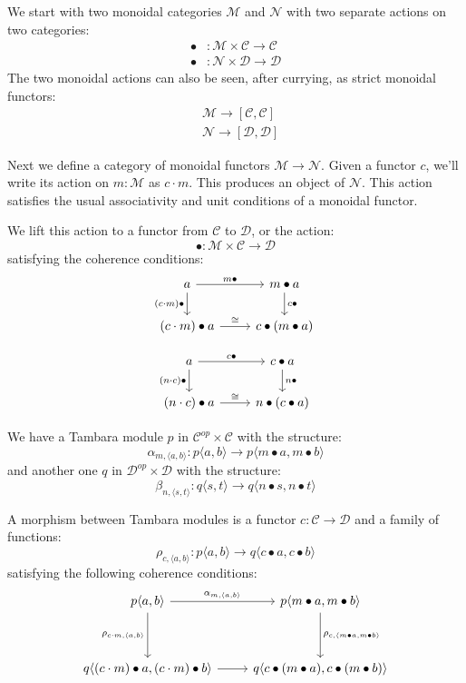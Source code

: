 \documentclass[11pt]{amsart}
\newcommand{\cat}[1]{\mathcal{#1}}%
\begin{document}
We start with two monoidal categories $\cat M$ and $\cat N$ with two separate actions on two categories:
\begin{align*} 
\bullet &\colon \cat M \times \cat C \to \cat C 
\\
 \bullet &\colon \cat N \times \cat D \to \cat D 
\end{align*}
The two monoidal actions can also be seen, after currying, as strict monoidal functors:
\begin{align*}
&\cat M \to [\cat C, \cat C]
\\
&\cat N \to [\cat D, \cat D]
\end{align*}

Next we define a category of monoidal functors $\cat M \to \cat N$. Given a functor $c$, we'll write its action on $m \colon \cat M$ as $c \cdot m$. This produces an object of $\cat N$. This action satisfies the usual associativity and unit conditions of a monoidal functor. 

We lift this action to a functor from $\cat C$ to  $\cat D$, or the action:
\[ \bullet \colon \cat M \times \cat C \to \cat D \]
satisfying the coherence conditions:
\[
 \begin{tikzcd}
 a
 \arrow [r, "m \bullet"] 
 \arrow [d, "(c \cdot m) \bullet"']
 & m \bullet a
 \arrow [d, "c \bullet"]
 \\
 (c \cdot m) \bullet a
 \arrow [r, "\cong"]
 & c \bullet (m \bullet a)
 \end{tikzcd}
\]

\[
 \begin{tikzcd}
 a
 \arrow [r, "c \bullet"] 
 \arrow [d, "(n \cdot c) \bullet"']
 & c \bullet a
 \arrow [d, "n \bullet"]
 \\
 (n \cdot c) \bullet a
 \arrow [r, "\cong"]
 & n \bullet (c \bullet a)
 \end{tikzcd}
\]


We have a Tambara module $p$ in $\cat C^{op} \times \cat C$ with the structure:
\[ \alpha_{m, \langle a, b \rangle} \colon p \langle a, b \rangle \to p \langle m \bullet a, m \bullet b \rangle \]
and another one $q$ in $\cat D^{op} \times \cat D$  with the structure:
\[ \beta_{n, \langle s, t \rangle} \colon q \langle s, t \rangle \to q \langle n \bullet s, n \bullet t \rangle \]

A morphism between Tambara modules is a functor $c \colon \cat C \to \cat D$ and a family of functions:
\[ \rho_{c, \langle a, b \rangle} \colon p \langle a, b \rangle \to q \langle c \bullet a, c \bullet b \rangle \]
satisfying the following coherence conditions:
\[
 \begin{tikzcd}
 p \langle a, b \rangle
 \arrow[r, "{\alpha_{m, \langle a, b \rangle}}"]
 \arrow[dd, "{\rho_{c \cdot m, \langle a, b \rangle}}"']
& p \langle m \bullet a, m \bullet b \rangle
 \arrow[dd, "{\rho_{c, \langle m \bullet a, m \bullet b \rangle}}"]
 \\
  \\
 q \langle (c \cdot m)  \bullet a, (c \cdot m) \bullet b \rangle
 \arrow[r, ""]
& q \langle c \bullet (m \bullet a), c \bullet (m \bullet b) \rangle
 \end{tikzcd}
\]
\end{document}
